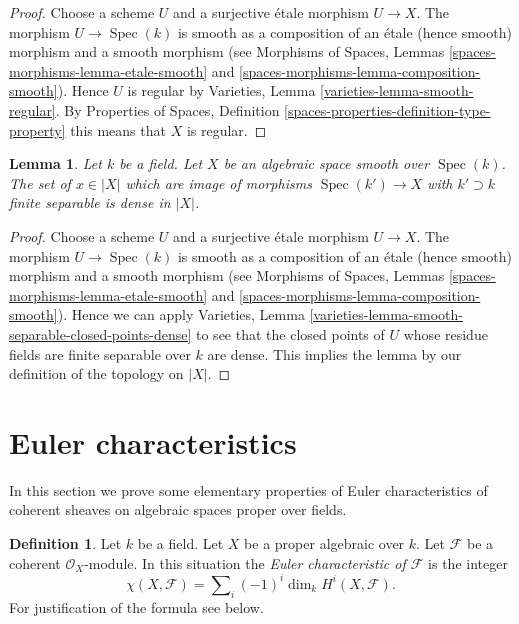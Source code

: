 \documentclass{stacks-project}
\theoremstyle{plain}
\newtheorem{lemma}[subsection]{Lemma}
\theoremstyle{definition}
\newtheorem{definition}[subsection]{Definition}
\theoremstyle{remark}
\numberwithin{equation}{subsection}
\def\Spec{\mathop{\mathrm{Spec}}}
\begin{document}
\begin{proof}
Choose a scheme $U$ and a surjective \'etale morphism $U \to X$.
The morphism $U \to \Spec(k)$ is smooth as a composition of
an \'etale (hence smooth) morphism and a smooth morphism (see
Morphisms of Spaces, Lemmas \ref{spaces-morphisms-lemma-etale-smooth}
and \ref{spaces-morphisms-lemma-composition-smooth}).
Hence $U$ is regular by
Varieties, Lemma \ref{varieties-lemma-smooth-regular}.
By
Properties of Spaces, Definition
\ref{spaces-properties-definition-type-property}
this means that $X$ is regular.
\end{proof}

\begin{lemma}
\label{lemma-smooth-separable-closed-points-dense}
Let $k$ be a field. Let $X$ be an algebraic space smooth over $\Spec(k)$.
The set of $x \in |X|$ which are image of morphisms $\Spec(k') \to X$
with $k' \supset k$ finite separable is dense in $|X|$.
\end{lemma}

\begin{proof}
Choose a scheme $U$ and a surjective \'etale morphism $U \to X$.
The morphism $U \to \Spec(k)$ is smooth as a composition of
an \'etale (hence smooth) morphism and a smooth morphism (see
Morphisms of Spaces, Lemmas \ref{spaces-morphisms-lemma-etale-smooth}
and \ref{spaces-morphisms-lemma-composition-smooth}).
Hence we can apply Varieties, Lemma
\ref{varieties-lemma-smooth-separable-closed-points-dense} to see that
the closed points of $U$ whose residue fields are finite separable over
$k$ are dense. This implies the lemma by our definition of the
topology on $|X|$.
\end{proof}







\section{Euler characteristics}
\label{section-euler}

\noindent
In this section we prove some elementary properties of Euler characteristics
of coherent sheaves on algebraic spaces proper over fields.

\begin{definition}
\label{definition-euler-characteristic}
Let $k$ be a field. Let $X$ be a proper algebraic over $k$. Let $\mathcal{F}$
be a coherent $\mathcal{O}_X$-module. In this situation the
{\it Euler characteristic of $\mathcal{F}$} is the integer
$$
\chi(X, \mathcal{F}) = \sum\nolimits_i (-1)^i \dim_k H^i(X, \mathcal{F}).
$$
For justification of the formula see below.
\end{definition}
\end{document}
